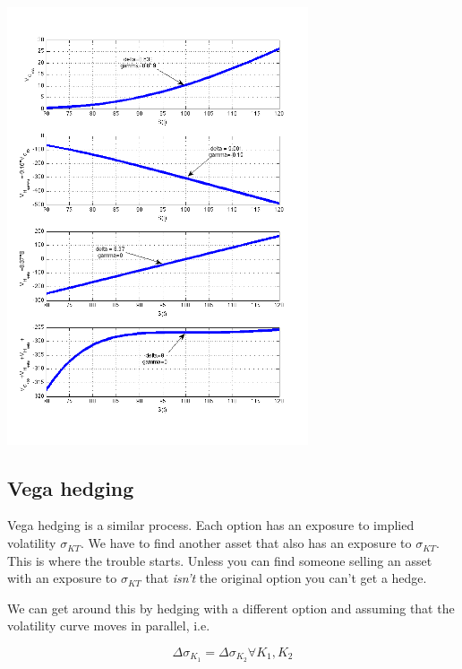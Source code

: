   \begin{center}
\includegraphics[width=3.5in]{pics/deltaGammaHedge}%
\label{fig:deltaGammaHedge}%
\end{center}


\subsection{Vega hedging}

Vega hedging is a similar process. Each option has an exposure to implied volatility $\sigma_{KT}$. We have to find another asset that also has an exposure to $\sigma_{KT}$. This is where the trouble starts. Unless you can find someone selling an asset with an exposure to $\sigma_{KT}$ that \textit{isn't} the original option you can't get a hedge. 

We can get around this by hedging with a different option and assuming that the volatility curve moves in parallel, i.e. 

\[ \Delta \sigma_{K_1} =  \Delta \sigma_{K_2} \forall K_1,K_2 \] 

